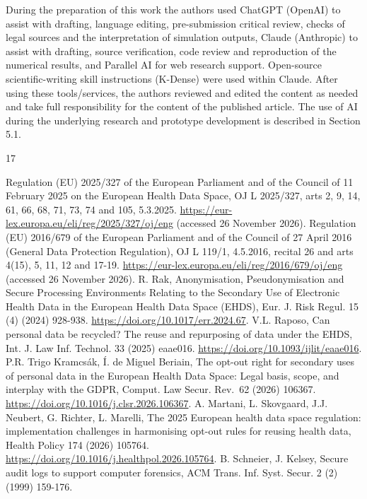 \documentclass[preprint,review,12pt]{elsarticle}
\begin{document}
During the preparation of this work the authors used ChatGPT (OpenAI) to
assist with drafting, language editing, pre-submission critical review,
checks of legal sources and the interpretation of simulation outputs,
Claude (Anthropic) to assist with drafting, source verification, code
review and reproduction of the numerical results, and Parallel AI for
web research support. Open-source scientific-writing skill instructions
(K-Dense) were used within Claude. After using these tools/services, the
authors reviewed and edited the content as needed and take full
responsibility for the content of the published article. The use of AI
during the underlying research and prototype development is described in
Section 5.1.

\begin{thebibliography}{17}
\setlength{\itemsep}{1pt}
\raggedright
{} Regulation (EU) 2025/327 of the European Parliament and of the
Council of 11 February 2025 on the European Health Data Space, OJ L
2025/327, arts 2, 9, 14, 61, 66, 68, 71, 73, 74 and 105, 5.3.2025.
\url{https://eur-lex.europa.eu/eli/reg/2025/327/oj/eng} (accessed 26
November 2026).
 Regulation (EU) 2016/679 of the European Parliament and of the
Council of 27 April 2016 (General Data Protection Regulation), OJ L
119/1, 4.5.2016, recital 26 and arts 4(15), 5, 11, 12 and 17-19.
\url{https://eur-lex.europa.eu/eli/reg/2016/679/oj/eng} (accessed 26
November 2026).
 R. Rak, Anonymisation, Pseudonymisation and Secure Processing
Environments Relating to the Secondary Use of Electronic Health Data in
the European Health Data Space (EHDS), Eur. J. Risk Regul. 15 (4) (2024)
928-938. \url{https://doi.org/10.1017/err.2024.67}.
 V.L. Raposo, Can personal data be recycled? The reuse and
repurposing of data under the EHDS, Int. J. Law Inf. Technol. 33 (2025)
eaae016. \url{https://doi.org/10.1093/ijlit/eaae016}.
 P.R. Trigo Kramcsák, Í. de Miguel Beriain, The opt-out right for
secondary uses of personal data in the European Health Data Space: Legal
basis, scope, and interplay with the GDPR, Comput. Law Secur. Rev.~62
(2026) 106367. \url{https://doi.org/10.1016/j.clsr.2026.106367}.
 A. Martani, L. Skovgaard, J.J. Neubert, G. Richter, L. Marelli,
The 2025 European health data space regulation: implementation
challenges in harmonising opt-out rules for reusing health data, Health
Policy 174 (2026) 105764.
\url{https://doi.org/10.1016/j.healthpol.2026.105764}.
 B. Schneier, J. Kelsey, Secure audit logs to support computer
forensics, ACM Trans. Inf. Syst. Secur. 2 (2) (1999) 159-176.

\end{thebibliography}
\end{document}
